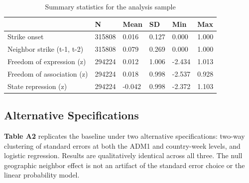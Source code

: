 \documentclass[
  11pt,
]{article}
\begin{document}
\begin{longtable}[]{@{}llllll@{}}

\caption{\label{tbl-sumstats}Summary statistics for the analysis sample}

\tabularnewline

\toprule\noalign{}
& N & Mean & SD & Min & Max \\
\midrule\noalign{}
\endhead
\bottomrule\noalign{}
\endlastfoot
Strike onset & 315808 & 0.016 & 0.127 & 0.000 & 1.000 \\
Neighbor strike (t-1, t-2) & 315808 & 0.079 & 0.269 & 0.000 & 1.000 \\
Freedom of expression (z) & 294224 & 0.012 & 1.006 & -2.434 & 1.013 \\
Freedom of association (z) & 294224 & 0.018 & 0.998 & -2.537 & 0.928 \\
State repression (z) & 294224 & -0.042 & 0.998 & -2.372 & 1.103 \\

\end{longtable}

\subsection{Alternative
Specifications}\label{alternative-specifications}

\textbf{Table A2} replicates the baseline under two alternative
specifications: two-way clustering of standard errors at both the ADM1
and country-week levels, and logistic regression. Results are
qualitatively identical across all three. The null geographic neighbor
effect is not an artifact of the standard error choice or the linear
probability model.
\end{document}
